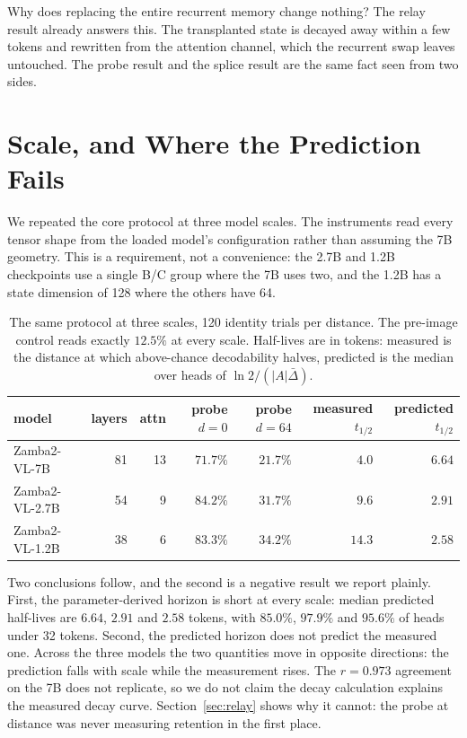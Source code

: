\documentclass{article}
\begin{document}
Why does replacing the entire recurrent memory change nothing? The relay
result already answers this. The transplanted state is decayed away within a
few tokens and rewritten from the attention channel, which the recurrent swap
leaves untouched. The probe result and the splice result are the same fact
seen from two sides.

\section{Scale, and Where the Prediction Fails}
\label{sec:scale}

We repeated the core protocol at three model scales. The instruments read
every tensor shape from the loaded model's configuration rather than assuming
the 7B geometry. This is a requirement, not a convenience: the 2.7B and 1.2B
checkpoints use a single B/C group where the 7B uses two, and the 1.2B has a
state dimension of 128 where the others have 64.

\begin{table}[t]
\centering\small
\begin{tabular}{lrrrrrr}
\toprule
model & layers & attn & probe $d{=}0$ & probe $d{=}64$ & measured $t_{1/2}$ & predicted $t_{1/2}$ \\
\midrule
Zamba2-VL-7B   & 81 & 13 & $71.7\%$ & $21.7\%$ & $4.0$  & $6.64$ \\
Zamba2-VL-2.7B & 54 &  9 & $84.2\%$ & $31.7\%$ & $9.6$  & $2.91$ \\
Zamba2-VL-1.2B & 38 &  6 & $83.3\%$ & $34.2\%$ & $14.3$ & $2.58$ \\
\bottomrule
\end{tabular}
\caption{The same protocol at three scales, 120 identity trials per distance.
The pre-image control reads exactly $12.5\%$ at every scale. Half-lives are in
tokens: measured is the distance at which above-chance decodability halves,
predicted is the median over heads of $\ln 2/(|A|\bar{\Delta})$.}
\label{tab:scale}
\end{table}

Two conclusions follow, and the second is a negative result we report plainly.
First, the parameter-derived horizon is short at every scale: median predicted
half-lives are $6.64$, $2.91$ and $2.58$ tokens, with $85.0\%$, $97.9\%$ and
$95.6\%$ of heads under 32 tokens. Second, the predicted horizon does not
predict the measured one. Across the three models the two quantities move in
opposite directions: the prediction falls with scale while the measurement
rises. The $r = 0.973$ agreement on the 7B does not replicate, so we do not
claim the decay calculation explains the measured decay curve.
Section~\ref{sec:relay} shows why it cannot: the probe at distance was never
measuring retention in the first place.
\end{document}

